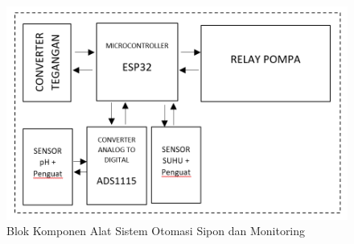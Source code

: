 \begin{figure}[htbp]
  \centering

  \includegraphics[scale=0.5]{gambar/blok.png}

  \caption{Blok Komponen Alat Sistem Otomasi Sipon dan Monitoring} %
  \label{fig:metodekomunikasi}
\end{figure}



